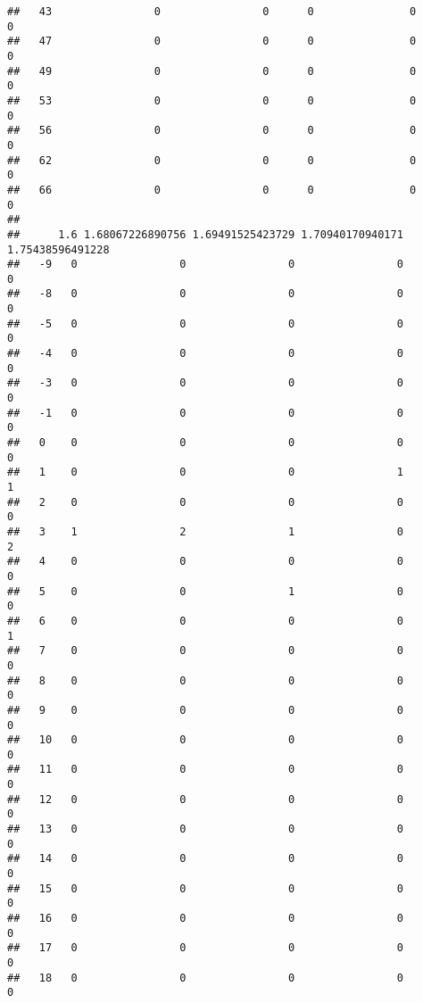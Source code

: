 \documentclass[]{article}
\begin{document}
\begin{verbatim}
##   43                0                0      0               0                0
##   47                0                0      0               0                0
##   49                0                0      0               0                0
##   53                0                0      0               0                0
##   56                0                0      0               0                0
##   62                0                0      0               0                0
##   66                0                0      0               0                0
##     
##      1.6 1.68067226890756 1.69491525423729 1.70940170940171 1.75438596491228
##   -9   0                0                0                0                0
##   -8   0                0                0                0                0
##   -5   0                0                0                0                0
##   -4   0                0                0                0                0
##   -3   0                0                0                0                0
##   -1   0                0                0                0                0
##   0    0                0                0                0                0
##   1    0                0                0                1                1
##   2    0                0                0                0                0
##   3    1                2                1                0                2
##   4    0                0                0                0                0
##   5    0                0                1                0                0
##   6    0                0                0                0                1
##   7    0                0                0                0                0
##   8    0                0                0                0                0
##   9    0                0                0                0                0
##   10   0                0                0                0                0
##   11   0                0                0                0                0
##   12   0                0                0                0                0
##   13   0                0                0                0                0
##   14   0                0                0                0                0
##   15   0                0                0                0                0
##   16   0                0                0                0                0
##   17   0                0                0                0                0
##   18   0                0                0                0                0

\end{verbatim}
\end{document}

